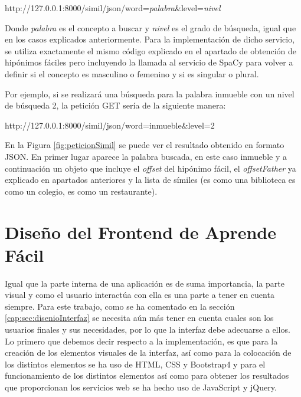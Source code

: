 http://127.0.0.1:8000/simil/json/word=\textit{palabra}\&level=\textit{nivel}

Donde \textit{palabra} es el concepto a buscar y \textit{nivel} es el grado de búsqueda, igual que en los casos explicados anteriormente.
Para la implementación de dicho servicio, se utiliza exactamente el mismo código explicado en el apartado de obtención de hipónimos fáciles pero incluyendo la llamada al servicio de SpaCy para volver a definir si el concepto es masculino o femenino y si es singular o plural.

Por ejemplo, si se realizará una búsqueda para la palabra inmueble con un nivel de búsqueda 2, la petición GET sería de la siguiente manera:

http://127.0.0.1:8000/simil/json/word=inmueble\&level=2

En la Figura \ref{fig:peticionSimil} se puede ver el resultado obtenido en formato JSON. En primer lugar aparece la palabra buscada, en este caso inmueble y a continuación un objeto que incluye el \textit{offset} del hipónimo fácil, el \textit{offsetFather}  ya explicado en apartados anteriores y la lista de símiles (es como una biblioteca es como un colegio, es como un restaurante).




\section{Diseño del Frontend  de Aprende Fácil}
Igual que la parte interna de una aplicación es de suma importancia, la parte visual y como el usuario interactúa con ella es una parte a tener en cuenta siempre. Para este trabajo, como se ha comentado en la sección \ref{cap:sec:disenioInterfaz}  se necesita aún más tener en cuenta cuales son los usuarios finales y sus necesidades, por lo que la interfaz debe adecuarse a ellos.
Lo primero que debemos decir respecto a la implementación, es que para la creación de los elementos visuales de la interfaz, así como para la colocación de los distintos elementos se ha uso de HTML, CSS y Bootstrap4 y para el funcionamiento de los distintos elementos así como para obtener los resultados que proporcionan los servicios web se ha hecho uso de JavaScript y jQuery.

